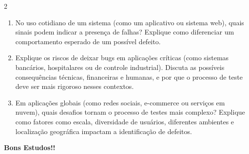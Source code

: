 \documentclass[a4paper,12pt]{article}
\begin{document}
\begin{multicols}{2}
\begin{enumerate}[leftmargin=*]
\item No uso cotidiano de um sistema (como um aplicativo ou sistema web), quais sinais podem indicar a presença de falhas? Explique como diferenciar um comportamento esperado de um possível defeito.

\vspace{0.2cm}

\item Explique os riscos de deixar bugs em aplicações críticas (como sistemas bancários, hospitalares ou de controle industrial). Discuta as possíveis consequências técnicas, financeiras e humanas, e por que o processo de teste deve ser mais rigoroso nesses contextos.

\vspace{0.2cm}

\item Em aplicações globais (como redes sociais, e-commerce ou serviços em nuvem), quais desafios tornam o processo de testes mais complexo? Explique como fatores como escala, diversidade de usuários, diferentes ambientes e localização geográfica impactam a identificação de defeitos.

\vspace{0.2cm}

\end{enumerate}

\end{multicols}

\vfill

\begin{center}
\textbf{Bons Estudos!!}
\end{center}
\end{document}

